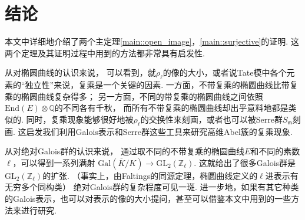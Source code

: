 \chapter{结论}

本文中详细地介绍了两个主定理\ref{main::open_image}，\ref{main::surjective}的证明.
这两个定理及其证明过程中用到的方法都非常具有启发性.

从对椭圆曲线的认识来说，
可以看到，就$\rho_{\ell}$的像的大小，或者说Tate模中各个元素的“独立性”来说，复乘是一个关键的因素.
一方面，不带复乘的椭圆曲线比带复乘的椭圆曲线复杂得多；
另一方面，不同的带复乘的椭圆曲线之间依照$\mathrm{End}(E)\otimes \mathbb{Q}$的不同各有千秋，
而所有不带复乘的椭圆曲线却出乎意料地都是类似的.
同时，复乘现象能够很好地被$\rho_{\ell}$的交换性来刻画，或者也可以被Serre群$S_{\mathfrak{m}}$刻画.
这启发我们利用Galois表示和Serre群这些工具来研究高维Abel簇的复乘现象.

从对绝对Galois群的认识来说，
通过取不同的不带复乘的椭圆曲线$E$和不同的素数$\ell$，可以得到一系列满射
$\mathrm{Gal}(\overline{K}/K) \to \mathrm{GL}_2(\mathbb{Z}_{\ell})$.
这就给出了很多Galois群是$\mathrm{GL}_2(\mathbb{Z}_{\ell})$的扩张.
（事实上，由Faltings的同源定理，椭圆曲线定义的$\ell$进表示有无穷多个同构类）
绝对Galois群的复杂程度可见一斑.
进一步地，如果有其它种类的Galois表示，也可以对表示的像的大小提问，甚至可以借鉴本文中用到的一些方法来进行研究.
